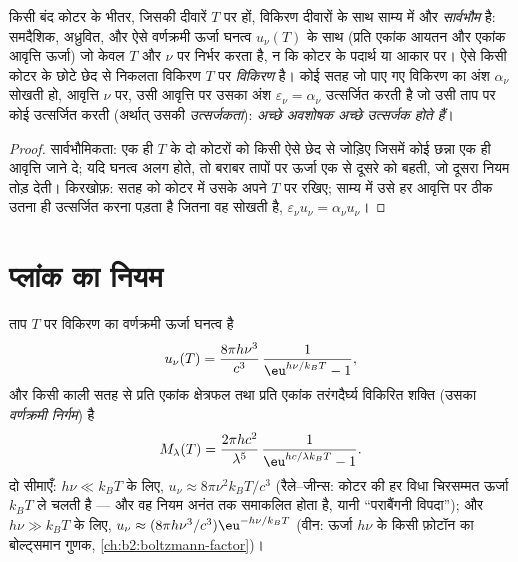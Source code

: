 \begin{proposition}[साम्य विकिरण और किरखोफ़ का नियम]\label{prop:b2:thermal-radiation:kirchhoff}
किसी बंद कोटर के भीतर, जिसकी दीवारें $T$ पर हों, विकिरण दीवारों के साथ
साम्य में और \emph{सार्वभौम} है: समदैशिक,
अध्रुवित, और ऐसे वर्णक्रमी ऊर्जा घनत्व $u_\nu(T)$ के साथ (प्रति एकांक
आयतन और एकांक आवृत्ति ऊर्जा) जो केवल $T$ और $\nu$ पर निर्भर करता है, न कि
कोटर के पदार्थ या आकार पर। ऐसे किसी कोटर के छोटे छेद से निकलता विकिरण
$T$ पर \emph{ विकिरण} है। कोई सतह जो पाए गए विकिरण का अंश
$\alpha_\nu$ सोखती हो, आवृत्ति $\nu$ पर, उसी आवृत्ति पर उसका अंश
$\varepsilon_\nu = \alpha_\nu$ उत्सर्जित करती है जो उसी ताप पर कोई 
उत्सर्जित करती (अर्थात् उसकी \emph{उत्सर्जकता}):
\emph{अच्छे अवशोषक अच्छे उत्सर्जक होते हैं}।
\end{proposition}

\begin{proof}
सार्वभौमिकता: एक ही $T$ के दो कोटरों को किसी ऐसे छेद से जोड़िए जिसमें कोई
छन्ना एक ही आवृत्ति जाने दे; यदि घनत्व अलग होते, तो बराबर तापों पर ऊर्जा
एक से दूसरे को बहती, जो दूसरा नियम तोड़ देती। किरखोफ़: सतह को
कोटर में उसके अपने $T$ पर रखिए; साम्य में उसे हर आवृत्ति पर ठीक उतना ही
उत्सर्जित करना पड़ता है जितना वह सोखती है,
$\varepsilon_\nu u_\nu = \alpha_\nu u_\nu$।
\end{proof}

\section{प्लांक का नियम}

\begin{theorem}[प्लांक का नियम]\label{thm:b2:thermal-radiation:planck}
ताप $T$ पर  विकिरण का वर्णक्रमी ऊर्जा घनत्व
है
\[
u_\nu(T) = \frac{8\pi h\nu^3}{c^3}\,\frac{1}{\eu^{h\nu/k_BT} - 1},
\]
और किसी काली सतह से प्रति एकांक क्षेत्रफल तथा प्रति एकांक
तरंगदैर्घ्य विकिरित शक्ति (उसका \emph{वर्णक्रमी निर्गम}) है
\[
M_\lambda(T) = \frac{2\pi hc^2}{\lambda^5}\,\frac{1}{\eu^{hc/\lambda k_BT} - 1}.
\]
दो सीमाएँ: $h\nu \ll k_BT$ के लिए, $u_\nu \approx 8\pi\nu^2 k_BT/c^3$
(रैले--जीन्स: कोटर की हर विधा चिरसम्मत ऊर्जा
$k_BT$ ले चलती है --- और वह नियम अनंत तक समाकलित होता है, यानी ``पराबैंगनी
विपदा''); और $h\nu \gg k_BT$ के लिए, $u_\nu \approx (8\pi h\nu^3/c^3)
\eu^{-h\nu/k_BT}$ (वीन: ऊर्जा $h\nu$ के किसी फ़ोटॉन का बोल्ट्समान गुणक,
\cref{ch:b2:boltzmann-factor})।
\end{theorem}

